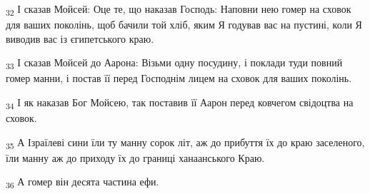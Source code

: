 \begin{tcolorbox}
\textsubscript{32} І сказав Мойсей: Оце те, що наказав Господь: Наповни нею гомер на сховок для ваших поколінь, щоб бачили той хліб, яким Я годував вас на пустині, коли Я виводив вас із єгипетського краю.
\end{tcolorbox}
\begin{tcolorbox}
\textsubscript{33} І сказав Мойсей до Аарона: Візьми одну посудину, і поклади туди повний гомер манни, і постав її перед Господнім лицем на сховок для ваших поколінь.
\end{tcolorbox}
\begin{tcolorbox}
\textsubscript{34} І як наказав Бог Мойсею, так поставив її Аарон перед ковчегом свідоцтва на сховок.
\end{tcolorbox}
\begin{tcolorbox}
\textsubscript{35} А Ізраїлеві сини їли ту манну сорок літ, аж до прибуття їх до краю заселеного, їли манну аж до приходу їх до границі ханаанського Краю.
\end{tcolorbox}
\begin{tcolorbox}
\textsubscript{36} А гомер він десята частина ефи.
\end{tcolorbox}
